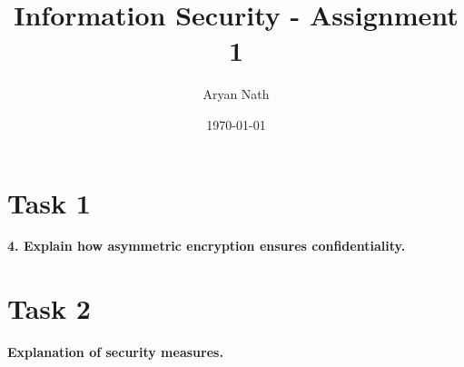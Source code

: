 \documentclass[11pt]{article}
\title{ Information Security - Assignment 1}
\author{Aryan Nath}
\date{\today}
\begin{document}
\maketitle

\section{Task 1}

\textbf{4. Explain how asymmetric encryption ensures confidentiality.}


\section{Task 2}

\textbf{Explanation of security measures.}
\end{document}
